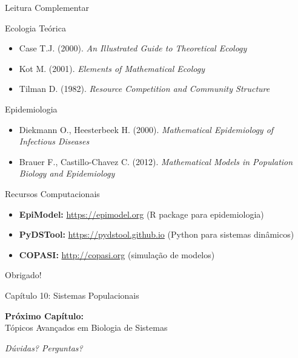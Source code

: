 \begin{frame}{Leitura Complementar}
\begin{block}{Ecologia Teórica}
\begin{itemize}
    \item Case T.J. (2000). \textit{An Illustrated Guide to Theoretical Ecology}
    \item Kot M. (2001). \textit{Elements of Mathematical Ecology}
    \item Tilman D. (1982). \textit{Resource Competition and Community Structure}
\end{itemize}
\end{block}

\begin{block}{Epidemiologia}
\begin{itemize}
    \item Diekmann O., Heesterbeek H. (2000). \textit{Mathematical Epidemiology of Infectious Diseases}
    \item Brauer F., Castillo-Chavez C. (2012). \textit{Mathematical Models in Population Biology and Epidemiology}
\end{itemize}
\end{block}

\begin{block}{Recursos Computacionais}
\begin{itemize}
    \item \textbf{EpiModel:} \url{https://epimodel.org} (R package para epidemiologia)
    \item \textbf{PyDSTool:} \url{https://pydstool.github.io} (Python para sistemas dinâmicos)
    \item \textbf{COPASI:} \url{http://copasi.org} (simulação de modelos)
\end{itemize}
\end{block}
\end{frame}

\begin{frame}
\begin{center}
{\Huge Obrigado!}

\vspace{1cm}

{\Large Capítulo 10: Sistemas Populacionais}

\vspace{1cm}

\textbf{Próximo Capítulo:}\\
Tópicos Avançados em Biologia de Sistemas

\vspace{1cm}

\textit{Dúvidas? Perguntas?}
\end{center}
\end{frame}


